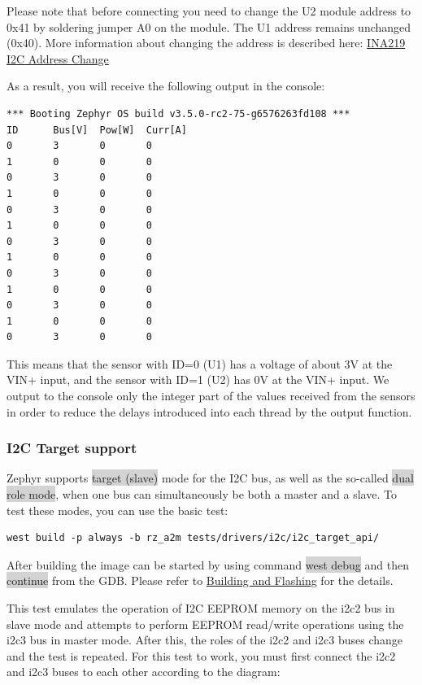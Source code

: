 \documentclass[11pt,a4paper,oneside]{article}
\begin{document}
Please note that before connecting you need to change the U2 module address to 0x41
by soldering jumper A0 on the module. The U1 address remains unchanged (0x40).
More information about changing the address is described here:
\href{https://whatibroke.com/2019/08/10/change-i2c-address-of-ina219/}{INA219 I2C Address Change}

As a result, you will receive the following output in the console:

\begin{lstlisting}
*** Booting Zephyr OS build v3.5.0-rc2-75-g6576263fd108 ***
ID      Bus[V]  Pow[W]  Curr[A]
0       3       0       0
1       0       0       0
0       3       0       0
1       0       0       0
0       3       0       0
1       0       0       0
0       3       0       0
1       0       0       0
0       3       0       0
1       0       0       0
0       3       0       0
1       0       0       0
0       3       0       0
\end{lstlisting}

This means that the sensor with ID=0 (U1) has a voltage of about 3V at the VIN+ input,
and the sensor with ID=1 (U2) has 0V at the VIN+ input. We output to the console only the
integer part of the values received from the sensors in order to reduce the delays
introduced into each thread by the output function.

\subsubsection{I2C Target support}\label{i2c-target-support}

Zephyr supports \colorbox{lightgray}{target (slave)} mode for the I2C bus, as well as the
so-called \colorbox{lightgray}{dual role mode}, when one bus can simultaneously
be both a master and a slave. To test these modes, you can use the basic test:

\begin{lstlisting}
west build -p always -b rz_a2m tests/drivers/i2c/i2c_target_api/
\end{lstlisting}

After building the image can be started by using command \colorbox{lightgray}{west debug}
and then \colorbox{lightgray}{continue} from the GDB. Please refer to
\hyperref[building-and-flashing]{Building and Flashing} for the
details.

This test emulates the operation of I2C EEPROM memory on the i2c2 bus in slave mode
and attempts to perform EEPROM read/write operations using the i2c3 bus in master mode.
After this, the roles of the i2c2 and i2c3 buses change and the test is repeated.
For this test to work, you must first connect the i2c2 and i2c3 buses to each other
according to the diagram:
\end{document}
